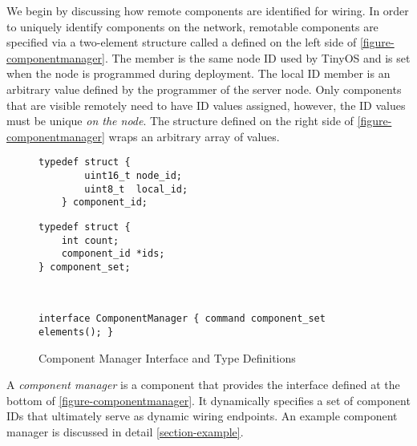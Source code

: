 We begin by discussing how remote components are identified for wiring.
In order to uniquely identify components on the network, remotable
components are specified via a two-element structure called a
 defined on the left side of
\autoref{figure-componentmanager}. The  member is the
same node ID used by TinyOS and is set when the node is programmed
during deployment. The local ID member is an arbitrary value defined by
the programmer of the server node. Only components that are visible
remotely need to have ID values assigned, however, the ID values must be
unique \emph{on the node}. The  structure defined
on the right side of \autoref{figure-componentmanager} wraps an
arbitrary array of  values.
 
\begin{figure}[!t]
\begin{textbox}{4in}
\begin{minipage}[t]{1.75in}
\begin{Verbatim}[fontsize=\small]
    typedef struct {
        uint16_t node_id;
        uint8_t  local_id;
    } component_id;
\end{Verbatim}
\end{minipage}
\hfill
\begin{minipage}[t]{1.75in}
\begin{Verbatim}[fontsize=\small]
typedef struct {
    int count;
    component_id *ids;
} component_set;
\end{Verbatim}
\end{minipage}
\\
\centering
\begin{minipage}[t]{5.8in}
\vspace{1.5em}
\begin{Verbatim}[fontsize=\small]
interface ComponentManager { command component_set elements(); }
\end{Verbatim}
\end{minipage}
\end{textbox}
\caption{Component Manager Interface and Type Definitions}
\label{figure-componentmanager}
\end{figure}

A \emph{component manager} is a component that provides the
 interface defined at the bottom of
\autoref{figure-componentmanager}. It dynamically specifies a set of
component IDs that ultimately serve as dynamic wiring endpoints. An
example component manager is discussed in detail
\autoref{section-example}.

